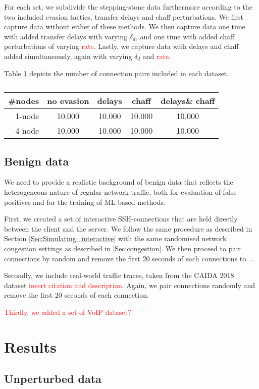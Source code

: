 \documentclass[conference]{IEEEtran}\usepackage[]{graphicx}\usepackage[]{color}
\begin{document}
For each set, we subdivide the stepping-stone data furthermore according to the two included evasion tactics, transfer delays and chaff perturbations. We first capture data without either of these methods. We then capture data one time with added transfer delays with varying $\delta_d$, and one time with added chaff perturbations of varying \textcolor{red}{rate}. Lastly, we capture data with delays and chaff added simultaneously, again with varying $\delta_d$ and \textcolor{red}{rate}.

Table \ref{Tab:Stepstone_data} depicts the number of connection pairs included in each dataset.

\begin{table}
\centering
\begin{tabular}{r|c|c|c|c}
#nodes & no evasion & delays & chaff & delays\& chaff \hline \\
\hline
1-node & 10.000 & 10.000 & 10.000 & 10.000 \hline \\
4-node & 10.000 & 10.000 & 10.000 & 10.000 \hline \\
\end{tabular}
\caption{}\label{Tab:Stepstone_data}
\end{table}







 
\subsection{Benign data}

We need to provide a realistic background of benign data that reflects the heterogeneous nature of regular network traffic, both for evaluation of false positives and for the training of ML-based methods.

First, we created a set of interactive SSH-connections that are held directly between the client and the server. We follow the same procedure as described in Section \ref{Sec:Simulating_interactive} with the same randomised network congestion settings as described in \ref{Sec:congestion}. We then proceed to pair connections by random and remove the first 20 seconds of each connections to ...

Secondly, we include real-world traffic traces, taken from the CAIDA 2018 dataset \textcolor{red}{insert citation and description}. Again, we pair connections randomly and remove the first 20 seconds of each connection. 

\textcolor{red}{Thirdly, we added a set of VoIP dataset?}


\section{Results}

\subsection{Unperturbed data}







\appendix




 
\end{document}
